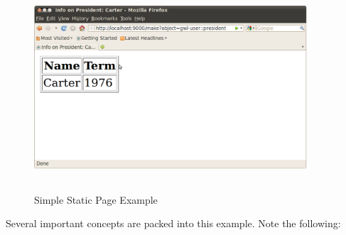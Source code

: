 \documentclass [11pt]{book}
\begin{document}
\begin{figure}
\begin{center}
\includegraphics[width=4in,height=3in]{../images/gwl-1.png}
\end{center}

\caption{Simple Static Page Example}

\label{fig:gwl-1-image}

\end{figure}




Several important concepts are packed into this example. Note the following:
\end{document}
